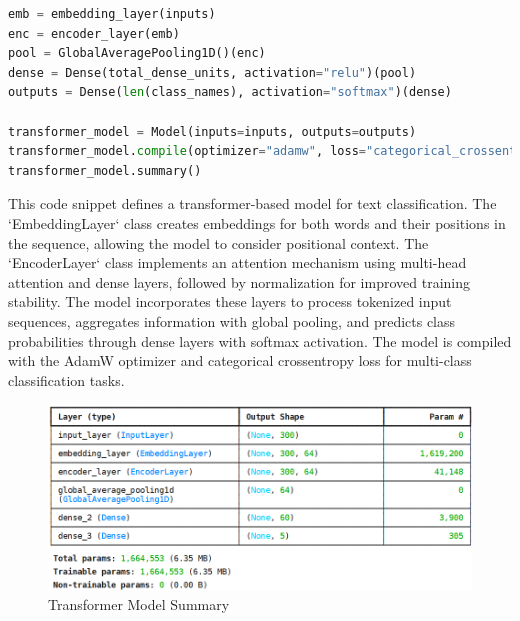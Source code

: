 \begin{tcolorbox}[colback=gray!5!white, colframe=gray!80!black, boxrule=0.5pt, title=Define Transformer Model]
    \begin{lstlisting}[language=Python]
emb = embedding_layer(inputs)
enc = encoder_layer(emb)
pool = GlobalAveragePooling1D()(enc)
dense = Dense(total_dense_units, activation="relu")(pool)
outputs = Dense(len(class_names), activation="softmax")(dense)

transformer_model = Model(inputs=inputs, outputs=outputs)
transformer_model.compile(optimizer="adamw", loss="categorical_crossentropy", metrics=['accuracy'])
transformer_model.summary()
    \end{lstlisting}
\end{tcolorbox}

\noindent
This code snippet defines a transformer-based model for text classification. The `EmbeddingLayer` class creates embeddings for both words and their positions in the sequence, allowing the model to consider positional context. The `EncoderLayer` class implements an attention mechanism using multi-head attention and dense layers, followed by normalization for improved training stability. The model incorporates these layers to process tokenized input sequences, aggregates information with global pooling, and predicts class probabilities through dense layers with softmax activation. The model is compiled with the AdamW optimizer and categorical crossentropy loss for multi-class classification tasks.

\begin{figure}[h!]  
    \centering
    \includegraphics[width=1.0\textwidth]{Images/TMODEL SUM.png}  
    \caption{Transformer Model Summary}
    \label{trans sum}  %
\end{figure}

